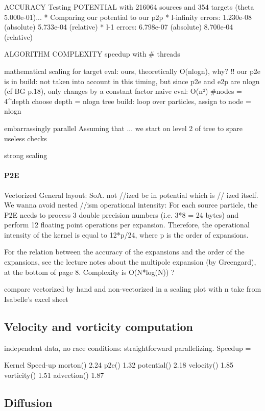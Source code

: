 \documentclass[a4paper,12pt,twoside]{article}
\begin{document}
ACCURACY 
Testing POTENTIAL with 216064 sources and 354 targets (theta 5.000e-01)...
 * Comparing our potential to our p2p
 * l-infinity errors: 1.230e-08 (absolute) 5.733e-04 (relative)
 * l-1 errors: 6.798e-07 (absolute) 8.700e-04 (relative)

ALGORITHM COMPLEXITY
speedup with # threads 

mathematical scaling for target eval: 
ours, theoretically O(nlogn), why? 
!! our p2e is in build: not taken into account in this timing, but since p2e and e2p are nlogn (cf BG p.18), only changes by a constant factor
naive eval: O(n²)
#nodes = 4^depth 
choose depth = nlogn 
tree build: loop over particles, assign to node = nlogn 

embarrassingly parallel
Assuming that ... we start on level 2 of tree to spare useless checks 

strong scaling


\paragraph{P2E}
Vectorized General layout: SoA.
not //ized bc in potential which is // ized itself. We wanna avoid nested //ism 
operational intensity:  For each source particle, the P2E needs to process 3 double precision numbers (i.e. 3*8 = 24 bytes) and perform 12 floating point operations per expansion. Therefore, the operational intensity of the kernel is equal to 12*p/24, where p is the order of expansions.

For the relation between the accuracy of the expansions and the order of the expansions, see the lecture notes about the multipole expansion (by Greengard), at the bottom of page 8. Complexity is O(N*log(N)) ?

compare vectorized by hand and non-vectorized in a scaling plot with n 
take from Isabelle's excel sheet 

\subsection{Velocity and vorticity computation}

independent data, no race conditions: straightforward parallelizing. Speedup = 


Kernel
Speed-up
morton()
2.24
p2e()
1.32
potential()
2.18
velocity()
1.85
vorticity()
1.51
advection()
1.87

\subsection{Diffusion}
\end{document}
